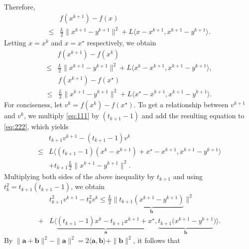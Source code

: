 \documentclass[letterpaper, 10 pt, conference]{ieeeconf}  %
\begin{document}
\begin{appendix}
Therefore,
\begin{equation*}
\begin{split}
      &f(x^{k+1})-f(x) \\\leq& \frac{L}{2}\|x^{k+1}-y^{k+1}\|^2 + L\langle x-x^{k+1},x^{k+1}-y^{k+1} \rangle.
\end{split}  
\end{equation*}
Letting $x = x^k$ and $x = x^\star$ respectively, we obtain
\begin{equation}\label{eq:111}
    \begin{split}
        &f(x^{k+1})-f(x^k)  \\ \leq& \frac{L}{2}\|x^{k+1}-y^{k+1}\|^2 + L\langle x^k-x^{k+1},x^{k+1}-y^{k+1} \rangle  ,
    \end{split}
\end{equation}
\begin{equation}\label{eq:222}
\begin{split}
    &f(x^{k+1})-f(x^\star)  \\ \leq& \frac{L}{2}\|x^{k+1}-y^{k+1}\|^2 + L \langle x^\star-x^{k+1},x^{k+1}-y^{k+1}\rangle .
\end{split}
\end{equation}
For conciseness, let $v^k = f(x^k)-f(x^\star)$. To get a relationship between $v^{k+1}$ and $v^k$, we multiply \eqref{eq:111} by $(t_{k+1}-1)$ and add the resulting equation to \eqref{eq:222}, which yields
\begin{equation*}
    \begin{split}
        &t_{k+1}v^{k+1} - (t_{k+1}-1)v^k  \\ \leq&   L \langle (t_{k+1}-1)(x^k-x^{k+1})+x^\star-x^{k+1},x^{k+1}-y^{k+1}\rangle \\
        &+ t_{k+1}\frac{L}{2}\|x^{k+1}-y^{k+1}\|^2.
    \end{split}
\end{equation*}
Multiplying both sides of the above inequality by $t_{k+1}$ and using $t_{k}^2 = t_{k+1}(t_{k+1}-1)$, we obtain
\begin{equation*}
    \begin{split}
        &t_{k+1}^2v^{k+1} - t_k^2v^k  \leq \frac{L}{2}\|\underbrace{t_{k+1}(x^{k+1}-y^{k+1})}_{\mathbf{b}}\|^2 \\+& L\langle \underbrace{(t_{k+1}-1)x^k-t_{k+1}x^{k+1}+x^\star}_{\mathbf{a}},\underbrace{t_{k+1}(x^{k+1}-y^{k+1}}_{\mathbf{b}})
\rangle.
    \end{split}
\end{equation*}
By $\|\mathbf{a}+\mathbf{b}\|^2 - \|\mathbf{a}\|^2 = 2\langle \mathbf{a},\mathbf{b}\rangle+\|\mathbf{b}\|^2$, it follows that

\end{appendix}
\end{document}

